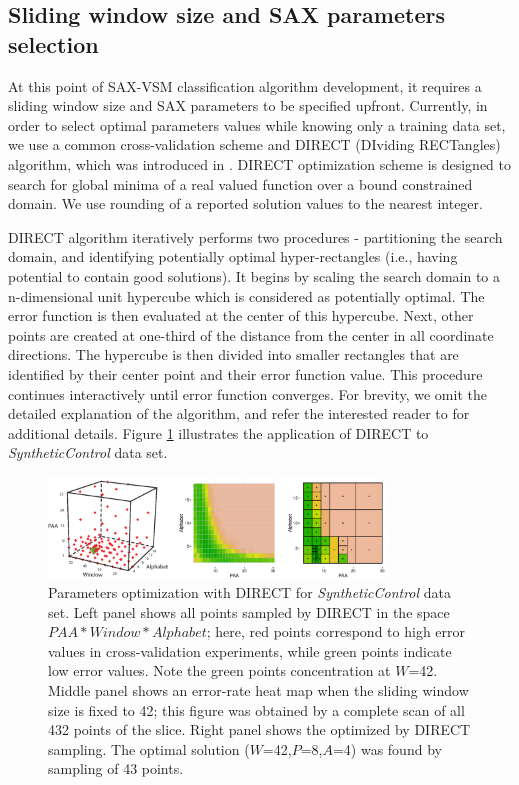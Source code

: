 \documentclass[conference]{IEEEtran}
\newcommand{\myfigureshrinker}{\vspace{0.05cm}}
\begin{document}
\subsection{Sliding window size and SAX parameters selection} \label{section-direct}
At this point of SAX-VSM classification algorithm development, it requires a sliding 
window size and SAX parameters to be specified upfront. 
Currently, in order to select optimal parameters values while knowing only a 
training data set, we use a common cross-validation scheme and DIRECT (DIviding RECTangles) 
algorithm, which was introduced in \cite{direct-original}.
DIRECT optimization scheme is designed to search for global minima of a real valued function 
over a bound constrained domain. We use rounding of a reported solution values 
to the nearest integer.

DIRECT algorithm iteratively performs two procedures - partitioning the search domain, 
and identifying potentially optimal hyper-rectangles (i.e., having potential to contain good
solutions). 
It begins by scaling the search domain to a n-dimensional unit hypercube which is considered 
as potentially optimal. The error function is then evaluated at the center of this hypercube. Next, 
other points are created at one-third of the distance from the center in all coordinate directions. 
The hypercube is then divided into smaller rectangles that are identified by their center point 
and their error function value. This procedure continues interactively until error function
converges.
For brevity, we omit the detailed explanation of the algorithm, and refer the 
interested reader to \cite{direct} for additional details. Figure  \ref{fig:direct-sampling} 
illustrates the application of DIRECT to \textit{SyntheticControl} data set.

\begin{figure}[t]
   \myfigureshrinker
   \centering
   \includegraphics[width=90mm]{figures/figure_direct.eps}
   \caption{Parameters optimization with DIRECT for \textit{SyntheticControl} data set. 
   Left panel shows all points sampled by DIRECT in the space $PAA*Window*Alphabet$; here,
   red points correspond to high error values in cross-validation experiments, while green points
   indicate low error values. Note the green points concentration at $W$=42. 
   Middle panel shows an error-rate heat map when the sliding window size is fixed to 42; 
   this figure was obtained by a complete scan of all 432 points of the slice. 
   Right panel shows the optimized by DIRECT sampling. The optimal solution 
   ($W$=42,$P$=8,$A$=4) was found by sampling of 43 points.}
   \label{fig:direct-sampling}
\end{figure}
\end{document}
